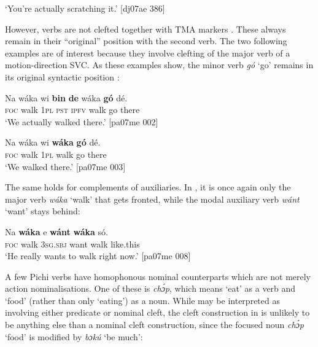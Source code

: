 \glt ‘You’re actually scratching it.’ [dj07ae 386]
\z


\z

However, verbs are not clefted together with TMA markers . These always remain in their “original” position with the second verb. The two following examples are of interest because they involve clefting of the major verb of a motion-direction SVC. As these examples show, the minor verb \textit{gó} ‘go’ remains in its original syntactic position : 


\ea%
    \label{ex:key:737}
    \gll Na  wáka  wi  \textbf{bin}  \textbf{de} wáka  \textbf{gó}  dé.\\
\textsc{foc}  walk  \textsc{1pl}  \textsc{pst}  \textsc{ipfv}  walk  go  there\\

\glt ‘We actually walked there.’ [pa07me 002]
\z


\ea%
    \label{ex:key:738}
    \gll Na  wáka  wi  \textbf{wáka}  \textbf{gó}  dé.\\
\textsc{foc}  walk  \textsc{1pl}  walk  go  there\\

\glt ‘We walked there.’ [pa07me 003]
\z

The same holds for complements of auxiliaries. In , it is once again only the major verb \textit{wáka} ‘walk’ that gets fronted, while the modal auxiliary verb \textit{wánt} ‘want’ stays behind: 


\ea%
    \label{ex:key:739}
    \gll Na  \textbf{wáka}  e    \textbf{wánt}  \textbf{wáka}  só.\\
\textsc{foc}  walk  \textsc{3sg.sbj}  want  walk  like.this\\

\glt ‘He really wants to walk right now.’ [pa07me 008]
\z

A few Pichi verbs have homophonous nominal counterparts which are not merely action nominalisations. One of these is \textit{chɔ́p}, which means ‘eat’ as a verb and ‘food’ (rather than only ‘eating’) as a noun. While  may be interpreted as involving either predicate or nominal cleft, the cleft construction in  is unlikely to be anything else than a nominal cleft construction, since the focused noun \textit{chɔ́p} ‘food’ is modified by \textit{bɔkú} ‘be much’:


